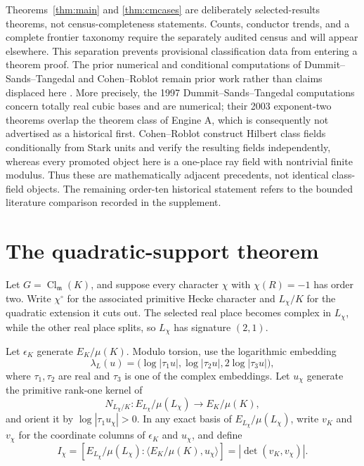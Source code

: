 \documentclass[11pt]{article}
\newcommand{\Cl}{\operatorname{Cl}}
\begin{document}
Theorems~\ref{thm:main} and \ref{thm:cmcases} are deliberately
selected-results theorems, not census-completeness statements.
Counts, conductor trends, and a complete frontier taxonomy require
the separately audited census and will appear elsewhere.  This
separation prevents provisional classification data from entering a
theorem proof.  The prior
numerical and conditional computations of
Dummit--Sands--Tangedal and Cohen--Roblot remain prior work rather
than claims displaced here
\cite{DST1997,DST2003,CohenRoblot2000}.
More precisely, the 1997 Dummit--Sands--Tangedal computations concern
totally real cubic bases and are numerical; their 2003 exponent-two
theorems overlap the theorem class of Engine A, which is consequently
not advertised as a historical first.  Cohen--Roblot construct
Hilbert class fields conditionally from Stark units and verify the
resulting fields independently, whereas every promoted object here is
a one-place ray field with nontrivial finite modulus.  Thus these are
mathematically adjacent precedents, not identical class-field
objects.  The remaining order-ten historical statement refers to the
bounded literature comparison recorded in the supplement.

\section{The quadratic-support theorem}

Let \(G=\Cl_{\mathfrak m}(K)\), and suppose every character
\(\chi\) with \(\chi(R)=-1\) has order two.  Write
\(\chi^\circ\) for the associated primitive Hecke character and
\(L_\chi/K\) for the quadratic extension it cuts out.  The selected
real place becomes complex in \(L_\chi\), while the other real place
splits, so \(L_\chi\) has signature \((2,1)\).

Let \(\epsilon_K\) generate \(E_K/\mu(K)\).  Modulo torsion, use the
logarithmic embedding
\begin{equation}\label{eq:log-embedding}
 \lambda_L(u)=
 \bigl(\log|\tau_1u|,\log|\tau_2u|,
       2\log|\tau_3u|\bigr),
\end{equation}
where \(\tau_1,\tau_2\) are real and \(\tau_3\) is one of the complex
embeddings.  Let \(u_\chi\) generate the primitive rank-one kernel of
\[
 N_{L_\chi/K}:E_{L_\chi}/\mu(L_\chi)
                  \longrightarrow E_K/\mu(K),
\]
and orient it by \(\log|\tau_1u_\chi|>0\).  In any exact basis of
\(E_{L_\chi}/\mu(L_\chi)\), write \(v_K\) and \(v_\chi\) for the
coordinate columns of \(\epsilon_K\) and \(u_\chi\), and define
\begin{equation}\label{eq:relative-index}
 I_\chi=
 [E_{L_\chi}/\mu(L_\chi):
   \langle E_K/\mu(K),u_\chi\rangle]
 =|\det(v_K,v_\chi)|.
\end{equation}
\end{document}
